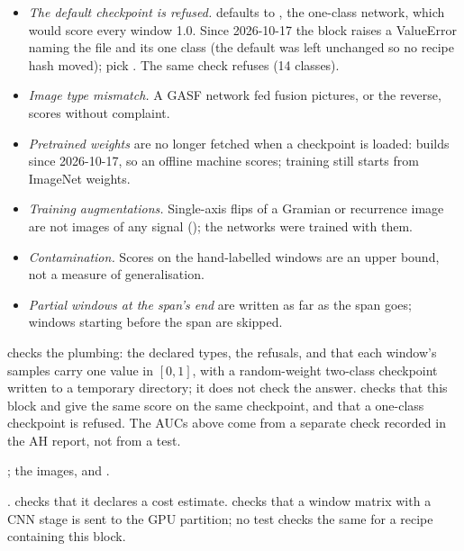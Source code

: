 \begin{itemize}
\item \emph{The default checkpoint is refused.}  defaults to
  , the one-class network, which would score every window 1.0. Since
  2026-10-17 the block raises a ValueError naming the file and its one class (the default was
  left unchanged so no recipe hash moved); pick . The same check refuses
   (14 classes).
\item \emph{Image type mismatch.} A GASF network fed fusion pictures, or the reverse, scores
  without complaint.
\item \emph{Pretrained weights} are no longer fetched when a checkpoint is loaded:
   builds  since 2026-10-17, so an
  offline machine scores; training still starts from ImageNet weights.
\item \emph{Training augmentations.} Single-axis flips of a Gramian or recurrence image are
  not images of any signal (); the
  networks were trained with them.
\item \emph{Contamination.} Scores on the hand-labelled windows are an upper bound, not a
  measure of generalisation.
\item \emph{Partial windows at the span's end} are written as far as the span goes; windows
  starting before the span are skipped.
\end{itemize}

 checks the plumbing: the declared types, the
refusals, and that each window's samples carry one value in $[0,1]$, with a random-weight
two-class checkpoint written to a temporary directory; it does not check the answer.
 checks that this block and
 give the same score on the same checkpoint, and
 that a one-class checkpoint is refused. The
AUCs above come from a separate check recorded in the AH report, not from a test.

\citet{tan2019efficientnet}; the images, \citet{wang2015imaging} and
\citet{eckmann1987recurrence}.

.  checks that it
declares a cost estimate.  checks that a window matrix with a
CNN stage is sent to the GPU partition; no test checks the same for a recipe containing this
block.
